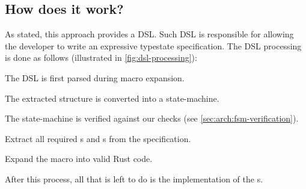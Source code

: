 \subsection{How does it work?}

As stated, this approach provides a DSL.
Such DSL is responsible for allowing the developer to write an expressive typestate specification.
The DSL processing is done as follows (illustrated in \autoref{fig:dsl-processing}):
\begin{compactenum}
    \item The DSL is first parsed during macro expansion.
    \item The extracted structure is converted into a state-machine.
    \item The state-machine is verified against our checks (see \autoref{sec:arch:fsm-verification}).
    \item Extract all required s and s from the specification.
    \item Expand the macro into valid Rust code.
\end{compactenum}
After this process, all that is left to do is the implementation of the s.

